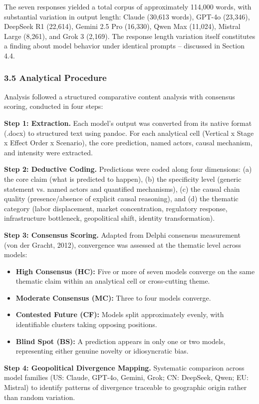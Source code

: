 \documentclass{article}
\begin{document}
The seven responses yielded a total corpus of approximately 114,000 words, with substantial variation in output length: Claude (30,613 words), GPT-4o (23,346), DeepSeek R1 (22,614), Gemini 2.5 Pro (16,330), Qwen Max (11,024), Mistral Large (8,261), and Grok 3 (2,169). The response length variation itself constitutes a finding about model behavior under identical prompts -- discussed in Section 4.4.


\subsubsection{3.5 Analytical Procedure}
\label{sec:3_5_analytical_procedure}

Analysis followed a structured comparative content analysis with consensus scoring, conducted in four steps:

\textbf{Step 1: Extraction.} Each model's output was converted from its native format (.docx) to structured text using pandoc. For each analytical cell (Vertical x Stage x Effect Order x Scenario), the core prediction, named actors, causal mechanism, and intensity were extracted.

\textbf{Step 2: Deductive Coding.} Predictions were coded along four dimensions: (a) the core claim (what is predicted to happen), (b) the specificity level (generic statement vs. named actors and quantified mechanisms), (c) the causal chain quality (presence/absence of explicit causal reasoning), and (d) the thematic category (labor displacement, market concentration, regulatory response, infrastructure bottleneck, geopolitical shift, identity transformation).

\textbf{Step 3: Consensus Scoring.} Adapted from Delphi consensus measurement (von der Gracht, 2012), convergence was assessed at the thematic level across models:

\begin{itemize}
  \item \textbf{High Consensus (HC):} Five or more of seven models converge on the same thematic claim within an analytical cell or cross-cutting theme.
  \item \textbf{Moderate Consensus (MC):} Three to four models converge.
  \item \textbf{Contested Future (CF):} Models split approximately evenly, with identifiable clusters taking opposing positions.
  \item \textbf{Blind Spot (BS):} A prediction appears in only one or two models, representing either genuine novelty or idiosyncratic bias.

\end{itemize}
\textbf{Step 4: Geopolitical Divergence Mapping.} Systematic comparison across model families (US: Claude, GPT-4o, Gemini, Grok; CN: DeepSeek, Qwen; EU: Mistral) to identify patterns of divergence traceable to geographic origin rather than random variation.
\end{document}
